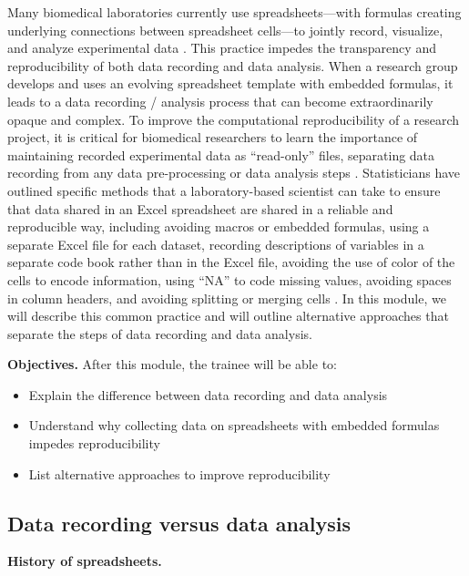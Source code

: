\documentclass[]{tufte-book}
\providecommand{\tightlist}{%
  \setlength{\itemsep}{0pt}\setlength{\parskip}{0pt}}
\begin{document}
Many biomedical laboratories currently use spreadsheets---with formulas creating
underlying connections between spreadsheet cells---to jointly record, visualize,
and analyze experimental data \citep{broman2018data}. This practice impedes the
transparency and reproducibility of both data recording and data analysis. When
a research group develops and uses an evolving spreadsheet template with
embedded formulas, it leads to a data recording / analysis process that can
become extraordinarily opaque and complex. To improve the computational
reproducibility of a research project, it is critical for biomedical researchers
to learn the importance of maintaining recorded experimental data as ``read-only''
files, separating data recording from any data pre-processing or data analysis
steps \citep{broman2018data, marwick2018packaging}. Statisticians have outlined
specific methods that a laboratory-based scientist can take to ensure that data
shared in an Excel spreadsheet are shared in a reliable and reproducible way,
including avoiding macros or embedded formulas, using a separate Excel file for
each dataset, recording descriptions of variables in a separate code book rather
than in the Excel file, avoiding the use of color of the cells to encode
information, using ``NA'' to code missing values, avoiding spaces in column
headers, and avoiding splitting or merging cells \citep{ellis2018share, broman2018data}. In this module, we will describe this common practice and will
outline alternative approaches that separate the steps of data recording and
data analysis.

\textbf{Objectives.} After this module, the trainee will be able to:

\begin{itemize}
\tightlist
\item
  Explain the difference between data recording and data analysis
\item
  Understand why collecting data on spreadsheets with embedded formulas impedes
  reproducibility
\item
  List alternative approaches to improve reproducibility
\end{itemize}

\hypertarget{data-recording-versus-data-analysis}{%
\subsection{Data recording versus data analysis}\label{data-recording-versus-data-analysis}}

\textbf{History of spreadsheets.}
\end{document}
